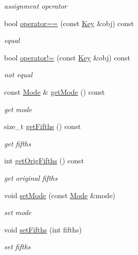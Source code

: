 \begin{DoxyCompactItemize}
\begin{DoxyCompactList}\small\item\em assignment operator \end{DoxyCompactList}\item 
bool \hyperlink{classsinsy_1_1Key_a742f3097f4ecbe1cb2a8e0b81b96f89e}{operator==} (const \hyperlink{classsinsy_1_1Key}{\-Key} \&obj) const 
\begin{DoxyCompactList}\small\item\em equal \end{DoxyCompactList}\item 
bool \hyperlink{classsinsy_1_1Key_a63958fac37a555816177428dd21493d9}{operator!=} (const \hyperlink{classsinsy_1_1Key}{\-Key} \&obj) const 
\begin{DoxyCompactList}\small\item\em not equal \end{DoxyCompactList}\item 
const \hyperlink{classsinsy_1_1Mode}{\-Mode} \& \hyperlink{classsinsy_1_1Key_a7cfd22cc0943b9b5000103d777d7050d}{get\-Mode} () const 
\begin{DoxyCompactList}\small\item\em get mode \end{DoxyCompactList}\item 
size\-\_\-t \hyperlink{classsinsy_1_1Key_a39c99b0a1183c7a5895d863345e4e046}{get\-Fifths} () const 
\begin{DoxyCompactList}\small\item\em get fifths \end{DoxyCompactList}\item 
\hypertarget{classsinsy_1_1Key_a3590154bf4478174415cc897c63ac8a4}{int \hyperlink{classsinsy_1_1Key_a3590154bf4478174415cc897c63ac8a4}{get\-Orig\-Fifths} () const }\label{classsinsy_1_1Key_a3590154bf4478174415cc897c63ac8a4}

\begin{DoxyCompactList}\small\item\em get original fifths \end{DoxyCompactList}\item 
void \hyperlink{classsinsy_1_1Key_a51dc61cab5e556710a892024717d4847}{set\-Mode} (const \hyperlink{classsinsy_1_1Mode}{\-Mode} \&mode)
\begin{DoxyCompactList}\small\item\em set mode \end{DoxyCompactList}\item 
\hypertarget{classsinsy_1_1Key_a070d063e788633189175588037a036dc}{void \hyperlink{classsinsy_1_1Key_a070d063e788633189175588037a036dc}{set\-Fifths} (int fifths)}\label{classsinsy_1_1Key_a070d063e788633189175588037a036dc}

\begin{DoxyCompactList}\small\item\em set fifths \end{DoxyCompactList}\end{DoxyCompactItemize}


